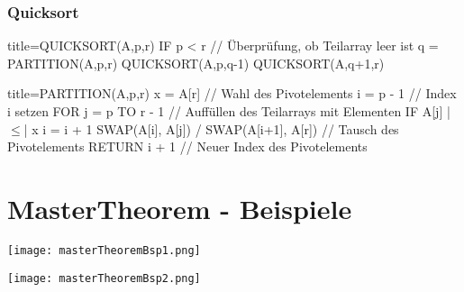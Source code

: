     \subsubsection*{Quicksort}
        \begin{ccode}[autogobble,escapeinside=||]{title={QUICKSORT(A,p,r)}}
        IF p < r    // Überprüfung, ob Teilarray leer ist
            q = PARTITION(A,p,r)
            QUICKSORT(A,p,q-1)
            QUICKSORT(A,q+1,r)
        \end{ccode}
    
        \begin{ccode}[autogobble,escapeinside=||]{title={PARTITION(A,p,r)}}
        x = A[r]    // Wahl des Pivotelements
        i = p - 1   // Index i setzen
        FOR j = p TO r - 1 // Auffüllen des Teilarrays mit Elementen
            IF A[j] |$\leq$| x
                i = i + 1
                SWAP(A[i], A[j]) /
        SWAP(A[i+1], A[r]) // Tausch des Pivotelements
        RETURN i + 1 // Neuer Index des Pivotelements
        \end{ccode}
    
\section*{MasterTheorem - Beispiele}

\centerline{\texttt{[image: masterTheoremBsp1.png]}}
\centerline{\texttt{[image: masterTheoremBsp2.png]}}
    
